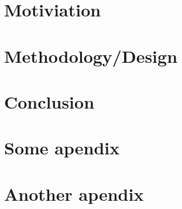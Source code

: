\documentclass{UoYCSproject}
\begin{document}
\chapter{Motiviation}
\label{cha:Motivation}


\chapter{Methodology/Design}
\label{cha:Methodology/Design}


\chapter{Conclusion}
\label{cha:conclusion}


\appendix
\chapter{Some apendix}


\chapter{Another apendix}
\end{document}
